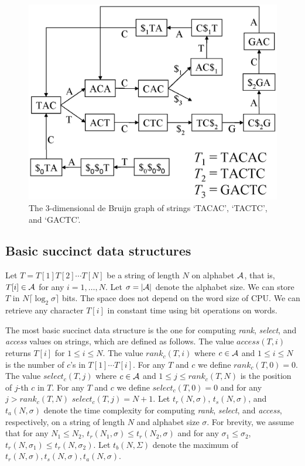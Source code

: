 \documentclass{llncs}
\def\rank{\textit{rank}}
\def\select{\textit{select}}
\def\access{\textit{access}}
\begin{document}
\begin{figure}[bt]
\begin{center}
  \includegraphics[scale=0.70]{fig3.eps}
\caption{The $3$-dimensional de Bruijn graph of strings `TACAC', `TACTC', and
`GACTC'.}
\label{fig:debruijn}
\end{center}
\end{figure}

\subsection{Basic succinct data structures}\label{sec:rank}

Let $T = T[1] T[2] \cdots T[N]$ be a string of length $N$ on alphabet ${\cal A}$,
that is, $T[i] \in {\cal A}$ for any $i=1,\ldots,N$.
Let $\sigma = |{\cal A}|$ denote the alphabet size.
We can store $T$ in $N \lceil \log_2 \sigma \rceil$ bits.  The space does not
depend on the word size of CPU.  We can retrieve any character $T[i]$ in constant
time using bit operations on words.

The most basic succinct data structure is the one for computing {\rank}, {\select}, and {\access}
values on strings, which are defined as follows.
The value ${\access}(T,i)$ returns $T[i]$ for $1 \le i \le N$.
The value ${\rank}_c(T,i)$ where $c \in {\cal A}$ and $1 \le i \le N$
is the number of $c$'s in $T[1] \cdots T[i]$.  For any $T$ and $c$ we define
${\rank}_c(T,0) = 0$.
The value ${\select}_c(T,j)$ where $c \in {\cal A}$ and $1 \le j \le {\rank}_c(T,N)$
is the position of $j$-th $c$ in $T$.
For any $T$ and $c$ we define ${\select}_c(T,0) = 0$ and for any $j > {\rank}_c(T,N)$
${\select}_c(T,j) = N+1$.
Let $t_r(N,\sigma)$, $t_s(N,\sigma)$, and $t_a(N,\sigma)$ denote the time complexity for computing
{\rank}, {\select}, and {\access}, respectively, on a string of length $N$ and alphabet size $\sigma$.
For brevity, we assume that 
for any $N_1 \le N_2$, $t_r(N_1,\sigma) \le t_r(N_2,\sigma)$ and
for any $\sigma_1 \le \sigma_2$, $t_r(N,\sigma_1) \le t_r(N,\sigma_2)$.
Let $t_b(N,\Sigma)$ denote the maximum of 
$t_r(N,\sigma),t_s(N,\sigma),t_a(N,\sigma)$.
\end{document}
